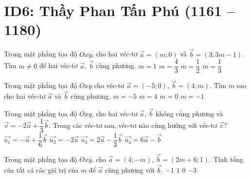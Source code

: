 \section*{ID6: Thầy Phan Tấn Phú (1161 -- 1180)}
\begin{ex}%
	Trong mặt phẳng tọa độ $Oxy$, cho hai véc-tơ $\vec{a}=(m;0)$ và $\vec{b}=(3;3m-1)$. Tìm $m\neq 0$ để hai véc-tơ $\vec{a}$, $\vec{b}$ cùng phương.
	\choice
	{$m=1$}
	{$m=\dfrac{4}{3}$}
	{$m=\dfrac{1}{2}$}
	{\True $m=\dfrac{1}{3}$}
\end{ex}
\begin{ex}%
	Trong mặt phẳng tọa độ $Oxy$ cho véc-tơ $\vec{a} =(-5;0)$, $\vec{b} =(4;m)$. Tìm $m$ sao cho hai véc-tơ $\vec{a}$ và $\vec{b}$ cùng phương.
	\choice
	{$m=-5$}
	{$m=4$}
	{\True $m=0$}
	{$m=-1$}
\end{ex}
\begin{ex}%
	Trong mặt phẳng tọa độ $Oxy$, cho hai véc-tơ $\vec{a}$, $\vec{b}$ không cùng phương và $\vec{v}=-2\vec{a}+\dfrac{1}{3}\vec{b}$. Trong các véc-tơ sau, véc-tơ nào cùng hướng với véc-tơ $\vec{v}$? 
	\choice
	{\True $\vec{u_1}=-\vec{a}+\dfrac{1}{6}\vec{b}$}
	{$\vec{u_2}=-2\vec{a}$}
	{$\vec{u_3}=2\vec{a}-\dfrac{1}{3}\vec{b}$}
	{$\vec{u_4}=6\vec{a}-\vec{b}$}
\end{ex}
\begin{ex}%
	Trong mặt phẳng tọa độ $Oxy$, cho $\vec{a}=(4;-m)$, $\vec{b}=(2m+6;1)$. Tính tổng của tất cả các giá trị của $m$ để $\vec{a}$ cùng phương với $\vec{b}$.
	\choice
	{$-1$}
	{$1$}
	{$0$}
	{\True $-3$}
\end{ex}
